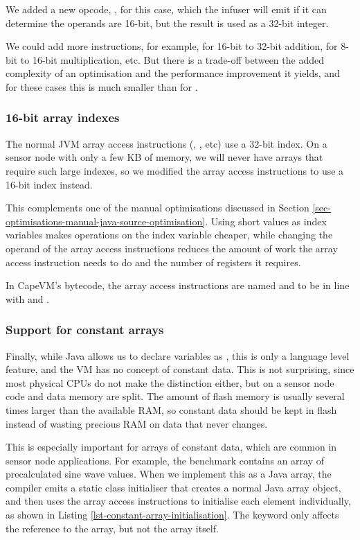 We added a new opcode, , for this case, which the infuser will emit if it can determine the operands are 16-bit, but the result is used as a 32-bit integer.

We could add more instructions, for example,  for 16-bit to 32-bit addition,  for 8-bit to 16-bit multiplication, etc. But there is a trade-off between the added complexity of an optimisation and the performance improvement it yields, and for these cases this is much smaller than for .

\subsubsection{16-bit array indexes}
The normal JVM array access instructions (, , etc) use a 32-bit index. On a sensor node with only a few KB of memory, we will never have arrays that require such large indexes, so we modified the array access instructions to use a 16-bit index instead. 

This complements one of the manual optimisations discussed in Section \ref{sec-optimisations-manual-java-source-optimisation}. Using short values as index variables makes operations on the index variable cheaper, while changing the operand of the array access instructions reduces the amount of work the array access instruction needs to do and the number of registers it requires.

In CapeVM's bytecode, the array access instructions are named  and  to be in line with  and .

\subsubsection{Support for constant arrays}
\label{sec-opt-constant-arrays}
Finally, while Java allows us to declare variables as , this is only a language level feature, and the VM has no concept of constant data. This is not surprising, since most physical CPUs do not make the distinction either, but on a sensor node code and data memory are split. The amount of flash memory is usually several times larger than the available RAM, so constant data should be kept in flash instead of wasting precious RAM on data that never changes.

This is especially important for arrays of constant data, which are common in sensor node applications. For example, the  benchmark contains an array of precalculated sine wave values. When we implement this as a  Java array, the compiler emits a static class initialiser that creates a normal Java array object, and then uses the array access instructions to initialise each element individually, as shown in Listing \ref{lst-constant-array-initialisation}. The  keyword only affects the reference to the  array, but not the array itself.


